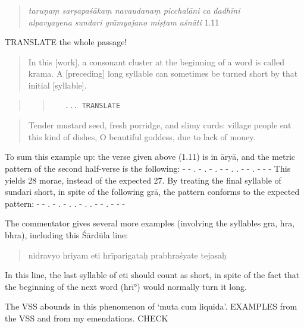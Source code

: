 \documentclass[12pt]{book}
\begin{document}
\begin{quote}
\emph{taruṇaṃ sarṣapaśākaṃ navaudanaṃ picchalāni ca dadhīni}
\textbar{}\\
\emph{alpavyayena sundari grāmyajano miṣṭam aśnāti} \textbar{}\textbar{}
1.11 \textbar{}\textbar{}
\end{quote}

TRANSLATE the whole passage!

\begin{quote}
In this {[}work{]}, a consonant cluster at the beginning of a word is
called krama. A {[}preceding{]} long syllable can sometimes be turned
short by that initial {[}syllable{]}.
\end{quote}

\begin{quote}
\begin{quote}
\begin{verbatim}
   ... TRANSLATE 
\end{verbatim}
\end{quote}
\end{quote}

\begin{quote}
Tender mustard seed, fresh porridge, and slimy curds: village people eat
this kind of dishes, O beautiful goddess, due to lack of money.
\end{quote}

To sum this example up: the verse given above (1.11) is in āryā, and the
metric pattern of the second half-verse is the following: - - . - . - .
- - . . - - . - - - This yields 28 morae, instead of the expected 27. By
treating the final syllable of sundari short, in spite of the following
grā, the pattern conforms to the expected pattern: - - . - . - . . - . .
- - . - - -

The commentator gives several more examples (involving the syllables
gra, hra, bhra), including this Śārdūla line:

\begin{quote}
nidravyo hriyam eti hrīparigataḥ prabhraśyate tejasaḥ
\end{quote}

In this line, the last syllable of eti should count as short, in spite
of the fact that the beginning of the next word (hrī°) would normally
turn it long.

The VSS abounds in this phenomenon of `muta cum liquida'. EXAMPLES from
the VSS and from my emendations. CHECK
\end{document}

